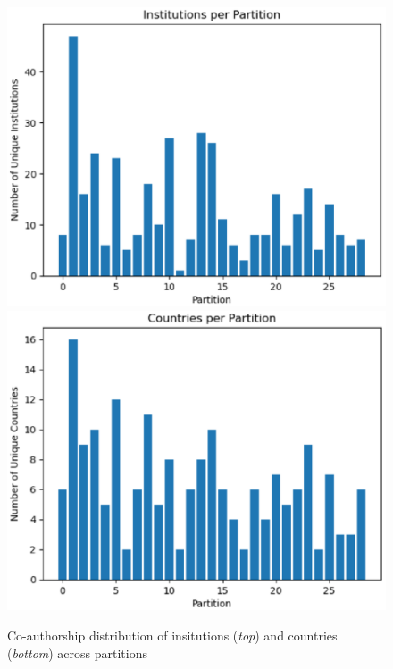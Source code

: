 \documentclass[a4paper, review, endfloat, authoryear]{elsarticle}
\begin{document}
	\begin{figure}[htbp]
		\centering
		\includegraphics[height=0.2\textheight, keepaspectratio]{pics/coauthorship_inst_per_partition.eps}
		\includegraphics[height=0.2\textheight, keepaspectratio]{pics/coauthorship_country_per_partition.eps}
		\caption{Co-authorship distribution of insitutions (\textit{top}) and countries (\textit{bottom}) across partitions}\label{fig:fig5}
	\end{figure}
\end{document}
